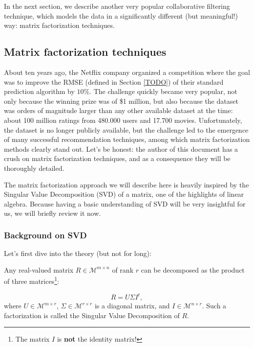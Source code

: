 In the next section, we describe another very popular collaborative filtering
technique, which models the data in a significantly different (but meaningful!)
way: matrix factorization techniques.

\subsection{Matrix factorization techniques}

About ten years ago, the Netflix company organized a competition where the goal
was to improve the RMSE (defined in Section \ref{TODO}) of their standard
prediction algorithm by $10\%$. The challenge quickly became very popular, not
only because the winning prize was of \$1 million, but also because the dataset
was orders of magnitude larger than any other available dataset at the time:
about 100 million ratings from 480.000 users and 17.700 movies. Unfortunately, the
dataset is no longer publicly available, but the challenge led to the emergence
of many successful recommendation techniques, among which matrix factorization
methods clearly stand out. Let's be honest: the author of this document has a
crush on matrix factorization techniques, and as a consequence they will be
thoroughly detailed.

The matrix factorization approach we will describe here is heavily inspired by
the Singular Value Decomposition (SVD) of a matrix, one of the highlights of
linear algebra. Because having a basic understanding of SVD will be very
insightful for us, we will briefly review it now.

\subsubsection{Background on SVD}

Let's first dive into the
theory (but not for long):

\begin{proposition}
  Any real-valued matrix $R \in \mathcal{M}^{m \times n}$ of rank $r$ can be
  decomposed as the product of three matrices\footnote{The matrix $I$ is
  \textbf{not} the identity matrix!}:

  $$R = U\Sigma I^t,$$
  where $U\in \mathcal{M}^{m \times r}$, $\Sigma\in \mathcal{M}^{r \times r}$
  is a diagonal matrix, and $I\in \mathcal{M}^{n \times r}$. Such a
  factorization is called the Singular Value Decomposition of $R$.
\end{proposition}


